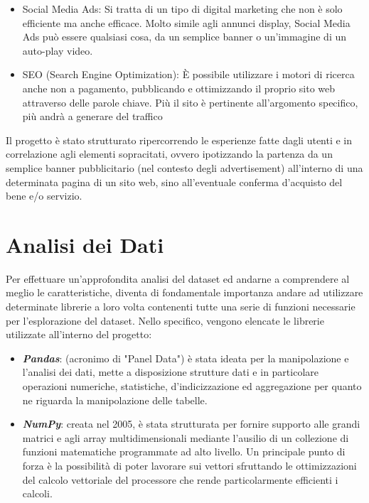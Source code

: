 \documentclass[10pt,a4paper]{article}
\begin{document}
\begin{itemize}
    \item Social Media Ads: Si tratta di un tipo di digital marketing che non è solo efficiente ma anche efficace. Molto simile agli annunci display, Social Media Ads può essere qualsiasi cosa, da un semplice banner o un’immagine di un auto-play video.
\end{itemize}
\begin{itemize}
    \item SEO (Search Engine Optimization): È possibile utilizzare i motori di ricerca anche non a pagamento, pubblicando e ottimizzando il proprio sito web attraverso delle parole chiave. Più il sito è pertinente all’argomento specifico, più andrà a generare del traffico
\end{itemize}
\hfill \break 
Il progetto è stato strutturato ripercorrendo le esperienze fatte dagli utenti e in correlazione agli elementi sopracitati, ovvero ipotizzando la partenza da un semplice banner pubblicitario (nel contesto degli advertisement) all'interno di una determinata pagina di un sito web, sino all'eventuale conferma d'acquisto del bene e/o servizio.
\clearpage

\section{Analisi dei Dati}
Per effettuare un'approfondita analisi del dataset ed andarne a comprendere al meglio le caratteristiche, diventa di fondamentale importanza andare ad utilizzare determinate librerie a loro volta contenenti tutte una serie di funzioni necessarie per l'esplorazione del dataset. Nello specifico, vengono elencate le librerie utilizzate all'interno del progetto:

\begin{itemize}
    \item  \textbf{\emph{Pandas}}: (acronimo di "Panel Data") è stata ideata per la manipolazione e l'analisi dei dati, mette a disposizione strutture dati e in particolare operazioni numeriche, statistiche, d'indicizzazione ed aggregazione per quanto ne riguarda la manipolazione delle tabelle.
   
\end{itemize}

\begin{itemize}
    \item \textbf{\emph{NumPy}}: creata nel 2005, è stata strutturata per fornire supporto alle grandi matrici e agli array multidimensionali mediante l'ausilio di un collezione di funzioni matematiche programmate ad alto livello. Un principale punto di forza è la possibilità di poter lavorare sui vettori sfruttando le ottimizzazioni del calcolo vettoriale del processore che rende particolarmente efficienti i calcoli.
\end{itemize}
\end{document}
